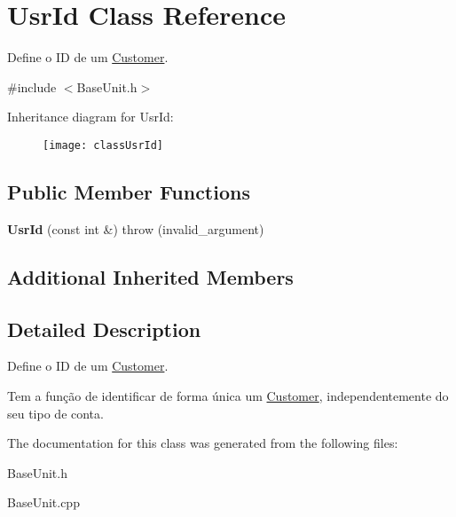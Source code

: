 \hypertarget{classUsrId}{\section{Usr\-Id Class Reference}
\label{classUsrId}
}


Define o I\-D de um \hyperlink{classCustomer}{Customer}.  




{\ttfamily \#include $<$Base\-Unit.\-h$>$}

Inheritance diagram for Usr\-Id\-:\begin{figure}[H]
\begin{center}
\leavevmode
\texttt{[image: classUsrId]}
\end{center}
\end{figure}
\subsection*{Public Member Functions}
\begin{DoxyCompactItemize}
\item 
\hypertarget{classUsrId_a3be81b6f539c0121803f9d88e9d89553}{{\bfseries Usr\-Id} (const int \&)  throw (invalid\-\_\-argument)}\label{classUsrId_a3be81b6f539c0121803f9d88e9d89553}

\end{DoxyCompactItemize}
\subsection*{Additional Inherited Members}


\subsection{Detailed Description}
Define o I\-D de um \hyperlink{classCustomer}{Customer}. 

Tem a função de identificar de forma única um \hyperlink{classCustomer}{Customer}, independentemente do seu tipo de conta. 

The documentation for this class was generated from the following files\-:\begin{DoxyCompactItemize}
\item 
Base\-Unit.\-h\item 
Base\-Unit.\-cpp\end{DoxyCompactItemize}
